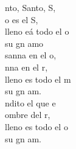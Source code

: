 \begin{cancion}[Santo][Mocedades]%
	nto, Santo, S,\\
	o es el S,\\
	lleno eá todo el o\\
	 su gn amo \\
	\jump
	sanna en el o,\\
	nna en el r,\\
	lleno es todo el m \\
	 su gn am.\\
	\jump
	ndito el que e\\
	ombre del r,\\
	lleno es todo el o \\
	 su gn am.\\
\end{cancion}%
